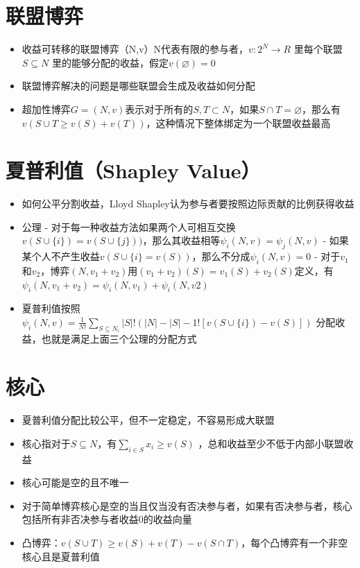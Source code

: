 \documentclass[]{book}
\providecommand{\tightlist}{%
  \setlength{\itemsep}{0pt}\setlength{\parskip}{0pt}}
\begin{document}
\section{联盟博弈}

\begin{itemize}
\tightlist
\item
  收益可转移的联盟博弈（N,v）N代表有限的参与者，\(v:2^N \rightarrow R\) 里每个联盟 \(S\subseteq N\) 里的能够分配的收益，假定\(v(\varnothing)=0\)
\item
  联盟博弈解决的问题是哪些联盟会生成及收益如何分配
\item
  超加性博弈\(G=(N,v)\)表示对于所有的\(S,T\subset N\)，如果\(S\cap T = \varnothing\)，那么有\(v(S\cup T\geq v(S)+v(T))\)，这种情况下整体绑定为一个联盟收益最高
\end{itemize}

\hypertarget{shapley-value}{%
\section{夏普利值（Shapley Value）}\label{shapley-value}}

\begin{itemize}
\item
  如何公平分割收益，Lloyd Shapley认为参与者要按照边际贡献的比例获得收益
\item
  公理
  - 对于每一种收益方法如果两个人可相互交换\(v(S\cup \{i\}) = v(S\cup \{j\}))\)，那么其收益相等\(\psi_i(N,v)=\psi_j(N,v)\)
  - 如果某个人不产生收益\(v(S\cup \{i\} = v(S))\)，那么不分成\(\psi_i(N,v)=0\)
  - 对于\(v_1\)和\(v_2\)，博弈\((N,v_1+v_2)\)用\((v_1+v_2)(S)=v_1(S)+v_2(S)\)定义，有\(\psi_i(N,v_1+v_2)=\psi_i(N,v_1)+\psi_i(N,v2)\)
\item
  夏普利值按照 \(\psi_i(N,v) = \frac{1}{N!}\sum_{S\subseteq N_i} |S|!(|N|-|S|-1![v(S\cup \{i\})-v(S)])\) 分配收益，也就是满足上面三个公理的分配方式
\end{itemize}

\section{核心}

\begin{itemize}
\tightlist
\item
  夏普利值分配比较公平，但不一定稳定，不容易形成大联盟
\item
  核心指对于\(S\subseteq N\)，有\(\sum_{i\in S} x_i \geq v(S)\) ，总和收益至少不低于内部小联盟收益
\item
  核心可能是空的且不唯一
\item
  对于简单博弈核心是空的当且仅当没有否决参与者，如果有否决参与者，核心包括所有非否决参与者收益0的收益向量
\item
  凸博弈：\(v(S\cup T)\geq v(S)+v(T)-v(S\cap T)\)，每个凸博弈有一个非空核心且是夏普利值
\end{itemize}
\end{document}
